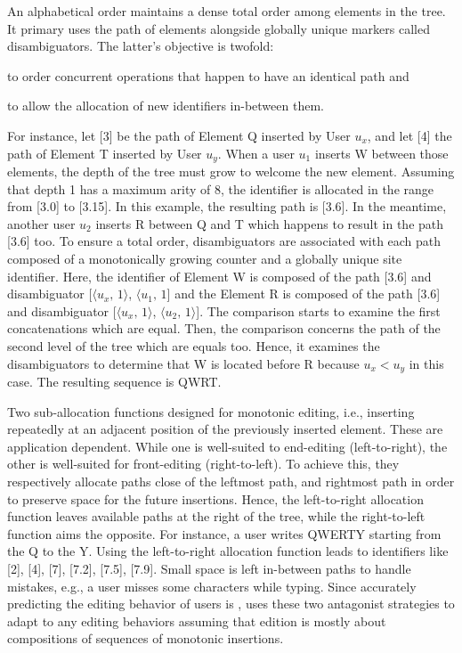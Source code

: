 \begin{asparadesc}
  An alphabetical order maintains a dense total order among elements in the
  tree. It primary uses the path of elements alongside globally unique markers
  called disambiguators. The latter's objective is twofold:
  \begin{inparaenum}[(i)]
  \item to order concurrent operations that happen to have an identical path and
  \item to allow the allocation of new identifiers in-between them.
  \end{inparaenum}
  For instance, let [3] be the path of Element Q inserted by User $u_x$, and let
  [4] the path of Element T inserted by User $u_y$. When a user $u_1$ inserts W
  between those elements, the depth of the tree must grow to welcome the new
  element. Assuming that depth 1 has a maximum arity of 8, the identifier is
  allocated in the range from [3.0] to [3.15].  In this example, the resulting
  path is [3.6]. In the meantime, another user $u_2$ inserts R between Q and T
  which happens to result in the path [3.6] too. To ensure a total order,
  disambiguators are associated with each path composed of a monotonically
  growing counter and a globally unique site identifier. Here, the identifier of
  Element W is composed of the path [3.6] and disambiguator
  [$\langle u_x,\,1\rangle$, $\langle u_1,\,1$] and the Element R is composed of
  the path [3.6] and disambiguator [$\langle u_x,\,1\rangle$,
  $\langle u_2,\,1\rangle$].  The comparison starts to examine the first
  concatenations which are equal.  Then, the comparison concerns the path of the
  second level of the tree which are equals too. Hence, it examines the
  disambiguators to determine that W is located before R because $u_x < u_y$ in
  this case. The resulting sequence is QWRT.
  
\item [Two sub-allocation functions] designed for monotonic editing, i.e.,
  inserting repeatedly at an adjacent position of the previously inserted
  element. These are application dependent. While one is well-suited to
  end-editing (left-to-right), the other is well-suited for front-editing
  (right-to-left). To achieve this, they respectively allocate paths close of
  the leftmost path, and rightmost path in order to preserve space for the
  future insertions. Hence, the left-to-right allocation function leaves
  available paths at the right of the tree, while the right-to-left function
  aims the opposite. For instance, a user writes QWERTY starting from the Q to
  the Y. Using the left-to-right allocation function leads to identifiers like
  [2], [4], [7], [7.2], [7.5], [7.9]. Small space is left in-between paths to
  handle mistakes, e.g., a user misses some characters while typing.  Since
  accurately predicting the editing behavior of users is ,
  \LSEQ uses these two antagonist strategies to adapt to any editing behaviors
  assuming that edition is mostly about compositions of sequences of monotonic
  insertions.
  

\end{asparadesc}
